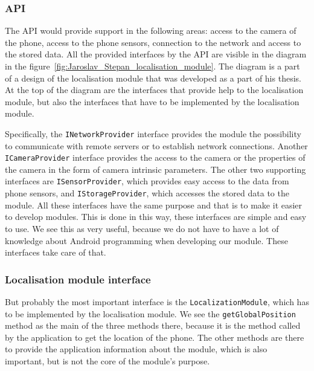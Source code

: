 \documentclass[thesis=B,english]{FITthesis}[2019/12/23]
\begin{document}
                \subsubsection*{API}
                The API would provide support in the following areas: access to the camera of the phone, access to the phone sensors, connection to the network and access to the stored data. All the provided interfaces by the API are visible in the diagram in the figure~\ref{fig:Jaroslav_Stepan_localisation_module}. The diagram is a part of a design of the localisation module that was developed as a part of his thesis. At the top of the diagram are the interfaces that provide help to the localisation module, but also the interfaces that have to be implemented by the localisation module.
                
                Specifically, the \texttt{INetworkProvider} interface provides the module the possibility to communicate with remote servers or to establish network connections. Another \texttt{ICameraProvider} interface provides the access to the camera or the properties of the camera in the form of camera intrinsic parameters. The other two supporting interfaces are \texttt{ISensorProvider}, which provides easy access to the data from phone sensors, and \texttt{IStorageProvider}, which accesses the stored data to the module. All these interfaces have the same purpose and that is to make it easier to develop modules. This is done in this way, these interfaces are simple and easy to use. We see this as very useful, because we do not have to have a lot of knowledge about Android programming when developing our module. These interfaces take care of that.
                
                \subsubsection*{Localisation module interface}
                But probably the most important interface is the \texttt{LocalizationModule}, which has to be implemented by the localisation module. We see the \texttt{getGlobalPosition} method as the main of the three methods there, because it is the method called by the application to get the location of the phone. The other methods are there to provide the application information about the module, which is also important, but is not the core of the module's purpose.
                
\end{document}
